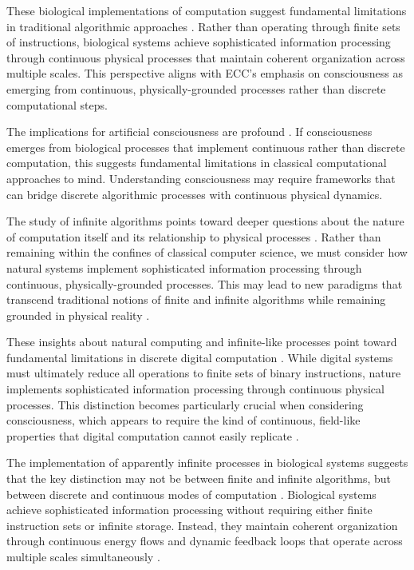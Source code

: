 These biological implementations of computation suggest fundamental limitations in traditional algorithmic approaches \cite{Copeland2004}. Rather than operating through finite sets of instructions, biological systems achieve sophisticated information processing through continuous physical processes that maintain coherent organization across multiple scales. This perspective aligns with ECC's emphasis on consciousness as emerging from continuous, physically-grounded processes rather than discrete computational steps.

The implications for artificial consciousness are profound \cite{Rogers1987}. If consciousness emerges from biological processes that implement continuous rather than discrete computation, this suggests fundamental limitations in classical computational approaches to mind. Understanding consciousness may require frameworks that can bridge discrete algorithmic processes with continuous physical dynamics.

The study of infinite algorithms points toward deeper questions about the nature of computation itself and its relationship to physical processes \cite{Hamkins2014}. Rather than remaining within the confines of classical computer science, we must consider how natural systems implement sophisticated information processing through continuous, physically-grounded processes. This may lead to new paradigms that transcend traditional notions of finite and infinite algorithms while remaining grounded in physical reality \cite{Sipser2012}.

These insights about natural computing and infinite-like processes point toward fundamental limitations in discrete digital computation \cite{Wegner2003}. While digital systems must ultimately reduce all operations to finite sets of binary instructions, nature implements sophisticated information processing through continuous physical processes. This distinction becomes particularly crucial when considering consciousness, which appears to require the kind of continuous, field-like properties that digital computation cannot easily replicate \cite{PourEl1989}.

The implementation of apparently infinite processes in biological systems suggests that the key distinction may not be between finite and infinite algorithms, but between discrete and continuous modes of computation \cite{Goldin2006}. Biological systems achieve sophisticated information processing without requiring either finite instruction sets or infinite storage. Instead, they maintain coherent organization through continuous energy flows and dynamic feedback loops that operate across multiple scales simultaneously \cite{Floyd2014}.

